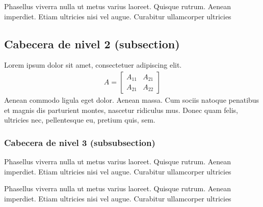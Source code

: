 \documentclass[paper=a4,fontsize=11pt]{scrartcl}
\numberwithin{equation}{section} %
\numberwithin{figure}{section}
\numberwithin{table}{section}
\begin{document}
Phasellus viverra nulla ut metus varius laoreet. Quisque rutrum. Aenean imperdiet. Etiam ultricies nisi vel augue. Curabitur ullamcorper ultricies


\subsection{Cabecera de nivel 2 (subsection)}

Lorem ipsum dolor sit amet, consectetuer adipiscing elit. 
\begin{align}
A = 
\begin{bmatrix}
A_{11} & A_{21} \\
A_{21} & A_{22}
\end{bmatrix}
\end{align}
Aenean commodo ligula eget dolor. Aenean massa. Cum sociis natoque penatibus et magnis dis parturient montes, nascetur ridiculus mus. Donec quam felis, ultricies nec, pellentesque eu, pretium quis, sem.



\subsubsection{Cabecera de nivel 3 (subsubsection)}

Phasellus viverra nulla ut metus varius laoreet. Quisque rutrum. Aenean imperdiet. Etiam ultricies nisi vel augue. Curabitur ullamcorper ultricies

Phasellus viverra nulla ut metus varius laoreet. Quisque rutrum. Aenean imperdiet. Etiam ultricies nisi vel augue. Curabitur ullamcorper ultricies
\end{document}
